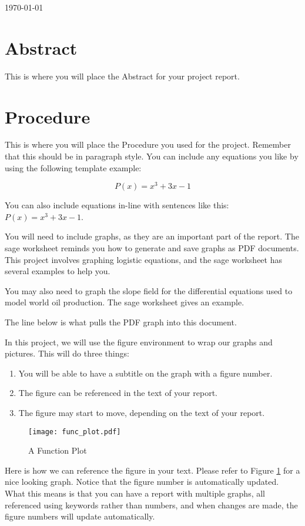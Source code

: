 \documentclass[11pt]{article}
\begin{document}
\today

\begin{report}
\section*{Abstract}
This is where you will place the Abstract for your project report.

\section*{Procedure}
This is where you will place the Procedure you used for the project. 
Remember that this should be in paragraph style. You can include any 
equations you like by using the following template example:

\[
    P(x) = x^3 + 3x - 1
\]

You can also include equations in-line with sentences like this: 
$P(x)=x^3+3x-1$.

You will need to include graphs, as they are an important part of 
the report. The sage worksheet reminds you how to generate and save 
graphs as PDF documents. This project involves graphing logistic 
equations, and the sage worksheet has several examples to help you.

You may also need to graph the slope field for the differential 
equations used to model world oil production. The sage worksheet 
gives an example.

The line below is what pulls the PDF graph into this document.

In this project, we will use the figure environment to wrap our 
graphs and pictures. This will do three things:
\begin{enumerate}
    \item You will be able to have a subtitle on the graph with a 
    figure number.
    \item The figure can be referenced in the text of your report.
    \item The figure may start to move, depending on the text of 
    your report.
\end{enumerate}

\begin{figure}
\texttt{[image: func\_plot.pdf]}
\caption{\label{l_func_plot} A Function Plot}
\end{figure}

Here is how we can reference the figure in your text. Please refer 
to Figure \ref{l_func_plot} for a nice looking graph. Notice that 
the figure number is automatically updated. What this means is that 
you can have a report with multiple graphs, all referenced using 
keywords rather than numbers, and when changes are made, the figure 
numbers will update automatically.


\end{report}
\end{document}
